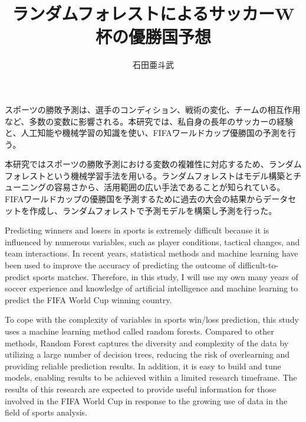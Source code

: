 \documentclass[platex]{suribt}
\title{ランダムフォレストによるサッカーW杯の優勝国予想}
\author{石田亜斗武}
\begin{document}
\maketitle%


\frontmatter%
\begin{jabstract}%
  スポーツの勝敗予測は、選手のコンディション、戦術の変化、チームの相互作用など、多数の変数に影響される。本研究では、私自身の長年のサッカーの経験と、人工知能や機械学習の知識を使い、FIFAワールドカップ優勝国の予測を行う。\par
  本研究ではスポーツの勝敗予測における変数の複雑性に対応するため、ランダムフォレストという機械学習手法を用いる。ランダムフォレストはモデル構築とチューニングの容易さから、活用範囲の広い手法であることが知られている。FIFAワールドカップの優勝国を予測するために過去の大会の結果からデータセットを作成し、ランダムフォレストで予測モデルを構築し予測を行った。

\end{jabstract}

\newpage


\begin{eabstract}%
  Predicting winners and losers in sports is extremely difficult because it is influenced by numerous variables, such as player conditions, tactical changes, and team interactions. In recent years, statistical methods and machine learning have been used to improve the accuracy of predicting the outcome of difficult-to-predict sports matches. Therefore, in this study, I will use my own many years of soccer experience and knowledge of artificial intelligence and machine learning to predict the FIFA World Cup winning country.\par
  To cope with the complexity of variables in sports win/loss prediction, this study uses a machine learning method called random forests. Compared to other methods, Random Forest captures the diversity and complexity of the data by utilizing a large number of decision trees, reducing the risk of overlearning and providing reliable prediction results. In addition, it is easy to build and tune models, enabling results to be achieved within a limited research timeframe. The results of this research are expected to provide useful information for those involved in the FIFA World Cup in response to the growing use of data in the field of sports analysis. 
\end{eabstract}

\setcounter{tocdepth}{2}
\tableofcontents%
\listoffigures%
\listoftables%
\end{document}
